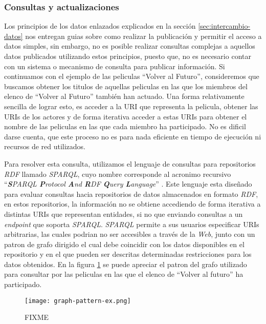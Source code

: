 \subsubsection{Consultas y actualizaciones}

Los principios de los datos enlazados explicados en la sección
\ref{sec:intercambio-datos} nos entregan guias sobre como realizar la
publicación y permitir el acceso a datos simples, sin embargo, no es posible
realizar consultas complejas a aquellos datos publicados utilizando estos
principios, puesto que, no es necesario contar con un sistema o mecanismo de
consulta para publicar información. Si continuamos con el ejemplo de las
peliculas ``Volver al Futuro'', consideremos que buscamos obtener los titulos de
aquellas peliculas en las que los miembros del elenco de ``Volver al Futuro''
también han actuado. Una forma relativamente sencilla de lograr esto, es acceder
a la URI que representa la pelicula, obtener las URIs de los actores y de forma
iterativa acceder a estas URIs para obtener el nombre de las peliculas en las
que cada miembro ha participado. No es dificil darse cuenta, que este proceso no
es para nada eficiente en tiempo de ejecución ni recursos de red utilizados.

Para resolver esta consulta, utilizamos el lenguaje de consultas para
repositorios \textit{RDF} llamado \textit{SPARQL}, cuyo nombre corresponde al
acronimo recursivo ``\textit{\textbf{S}PARQL \textbf{P}rotocol \textbf{A}nd
\textbf{R}DF \textbf{Q}uery \textbf{L}anguage}'' \cite{world2013sparql}. Este
lenguaje esta diseñado para evaluar consultas hacia repositorios de datos
almacenados en formato \textit{RDF}, en estos repositorios, la información no se
obtiene accediendo de forma iterativa a distintas URIs que representan
entidades, si no que enviando consultas a un \textit{endpoint} que soporta
\textit{SPARQL}. \textit{SPARQL} permite a sus usuarios especificar URIs
arbitrarias, las cuales podrian no ser accesibles a través de la \textit{Web},
junto con un patron de grafo dirigido el cual debe coincidir con los datos
disponibles en el repositorio y en el que pueden ser descritas determinadas
restricciones para los datos obtenidos. En la figura \ref{fig:graph-pattern-ex}
se puede apreciar el patron del grafo utilizado para consultar por las peliculas
en las que el elenco de ``Volver al futuro'' ha participado.

\begin{figure}
    \centering
    \texttt{[image: graph-pattern-ex.png]}
    \caption{FIXME}
    \label{fig:graph-pattern-ex}
\end{figure}

